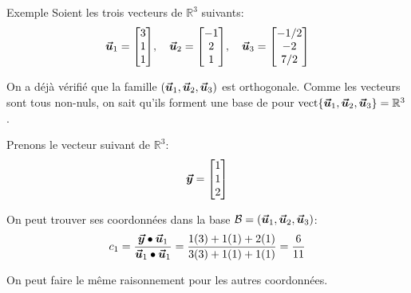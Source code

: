 \documentclass[a4paper]{article}
\begin{document}
\begin{parag}{Exemple}
    Soient les trois vecteurs de $\mathbb{R}^3$ suivants:
    \[\bvec{u}_1 = \begin{bmatrix} 3 \\ 1 \\ 1 \end{bmatrix}, \mathspace \bvec{u}_2 = \begin{bmatrix} -1 \\ 2 \\ 1 \end{bmatrix}, \mathspace \bvec{u}_3 = \begin{bmatrix} -1 / 2 \\ -2 \\ 7 / 2 \end{bmatrix} \]

    On a déjà vérifié que la famille $\left(\bvec{u}_1, \bvec{u}_2, \bvec{u}_3\right)$ est orthogonale. Comme les vecteurs sont tous non-nuls, on sait qu'ils forment une base de pour $\vect\left\{\bvec{u}_1, \bvec{u}_2, \bvec{u}_3\right\} = \mathbb{R}^3$.

    Prenons le vecteur suivant de $\mathbb{R}^3$:
    \[\bm{\protect\vec{y}} = \begin{bmatrix} 1 \\ 1 \\ 2 \end{bmatrix} \]

    On peut trouver ses coordonnées dans la base $\mathcal{B} = \left(\bvec{u}_1, \bvec{u}_2, \bvec{u}_3\right)$:
    \[c_1 = \frac{\bvec{y} \dotprod \bvec{u}_1}{\bvec{u}_1 \dotprod \bvec{u}_1} = \frac{1\left(3\right) + 1\left(1\right) + 2\left(1\right)}{3\left(3\right) + 1\left(1\right) + 1\left(1\right)} = \frac{6}{11}\]

    On peut faire le même raisonnement pour les autres coordonnées.
\end{parag}
\end{document}
